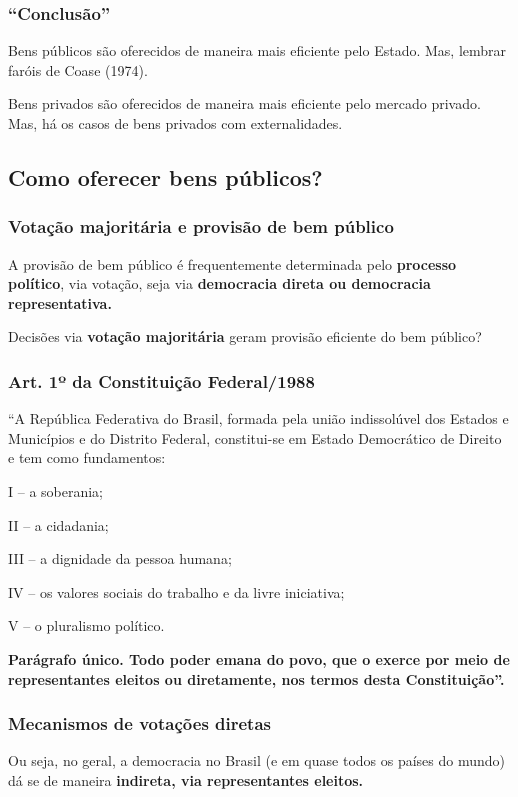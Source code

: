 \documentclass[a4paper,12pt]{article}[abntex2]
\begin{document}
\subsubsection{\textbf{“Conclusão”}}
Bens públicos são oferecidos de maneira mais eficiente pelo Estado. Mas, lembrar faróis de Coase (1974).

Bens privados são oferecidos de maneira mais eficiente pelo mercado privado. Mas, há os casos de bens privados com externalidades.

\subsection{\textbf{Como oferecer bens públicos?}}
\subsubsection{\textbf{Votação majoritária e provisão de bem público}}
A provisão de bem público é frequentemente determinada pelo \textbf{processo político}, via votação, seja via \textbf{democracia direta ou democracia representativa.}

Decisões via \textbf{votação majoritária} geram provisão eficiente do bem público?

\subsubsection{\textbf{Art. 1º da Constituição Federal/1988}}
“A República Federativa do Brasil, formada pela união indissolúvel dos Estados e Municípios e do Distrito Federal, constitui-se em Estado Democrático de Direito e tem como fundamentos:

I – a soberania;

II – a cidadania;

III – a dignidade da pessoa humana;

IV – os valores sociais do trabalho e da livre iniciativa; 

V – o pluralismo político.

\textbf{Parágrafo único. Todo poder emana do povo, que o exerce por meio de representantes eleitos ou diretamente, nos termos desta Constituição”. }

\subsubsection{\textbf{Mecanismos de votações diretas }}

Ou seja, no geral, a democracia no Brasil (e em quase todos os países do mundo) dá se de maneira \textbf{indireta, via representantes eleitos. }
\end{document}
